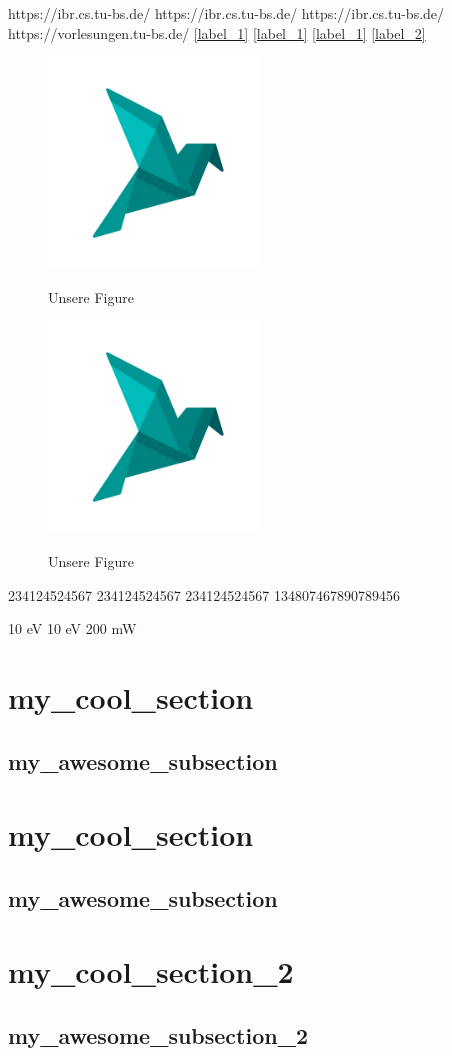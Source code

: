 \usepackage{graphicx}

https://ibr.cs.tu-bs.de/
https://ibr.cs.tu-bs.de/
https://ibr.cs.tu-bs.de/
https://vorlesungen.tu-bs.de/
\ref{label_1}
\ref{label_1}
\ref{label_1}
\ref{label_2}

\begin{figure}
    \centering
    \includegraphics[width=0.5\textwidth]{../assets/logomark.png}
    \label{logo}
    \caption{Unsere Figure}
\end{figure}

\begin{figure}
    \centering
    \includegraphics[width=0.5\textwidth]{../assets/logomark.png}
    \label{logo}
    \caption{Unsere Figure}
\end{figure}

234124524567
234124524567
234124524567
134807467890789456

10 eV
10 eV
200 mW

\section{my_cool_section}
\subsection{my_awesome_subsection}

\section{my_cool_section}
\subsection{my_awesome_subsection}

\section{my_cool_section_2}
\subsection{my_awesome_subsection_2}

